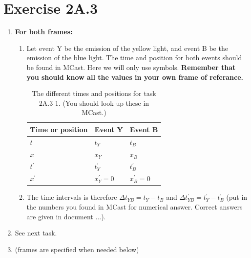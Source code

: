 \documentclass[a4paper,10pt,english]{article}
\begin{document}
\section*{Exercise 2A.3}

\begin{enumerate}

\item \textbf{For both frames:}

\begin{enumerate}

\item Let event Y be the emission of the yellow light, and event B be the emission of the blue light. The time and position for both events should be found in MCast. Here we will only use symbols. \textbf{Remember that you should know all the values in your own frame of referance.}

\begin{table}[H]
  \begin{center}
    \begin{tabular}{| l | l | l | }
   	\hline
	 Time or position & Event Y & Event B \\ \hline
	 $t$ & $t_Y$ & $t_B$ \\ \hline
	 $x$ & $x_Y$ & $x_B$ \\ \hline
	 $t^{\prime}$ & $t_Y^{\prime}$ & $t_B^{\prime}$ \\ \hline
	 $x^{\prime}$ & $x_Y^{\prime}=0$ & $x_B^{\prime}=0$ \\ \hline
	\end{tabular}
    \caption{The different times and positions for task 2A.3 1. (You should look up these in MCast.)}
    \label{tabel:1}
  \end{center}
\end{table}
\FloatBarrier

\item The time intervals is therefore $\Delta t_{YB}=t_{Y}-t_{B}$ and $\Delta t_{YB}^{\prime}=t_Y^{\prime}-t_B^{\prime}$ (put in the numbers you found in MCast for numerical answer. Correct answers are given in document $\ldots$).

\end{enumerate}

\item See next task.
\item (frames are specified when needed below)

\begin{enumerate}


\end{enumerate}
\end{enumerate}
\end{document}
